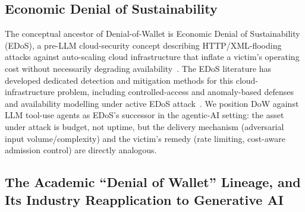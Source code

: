 \documentclass[conference]{IEEEtran}
\begin{document}
\subsection{Economic Denial of Sustainability}

The conceptual ancestor of Denial-of-Wallet is Economic Denial of Sustainability (EDoS), a pre-LLM cloud-security concept describing HTTP/XML-flooding attacks against auto-scaling cloud infrastructure that inflate a victim's operating cost without necessarily degrading availability~\cite{baig2013edos}. The EDoS literature has developed dedicated detection and mitigation methods for this cloud-infrastructure problem, including controlled-access and anomaly-based defenses~\cite{shawahna2018edos} and availability modelling under active EDoS attack~\cite{lalropuia2021edos}. We position DoW against LLM tool-use agents as EDoS's successor in the agentic-AI setting: the asset under attack is budget, not uptime, but the delivery mechanism (adversarial input volume/complexity) and the victim's remedy (rate limiting, cost-aware admission control) are directly analogous.

\subsection{The Academic ``Denial of Wallet'' Lineage, and Its Industry Reapplication to Generative AI}
\end{document}
